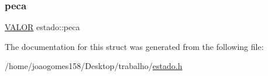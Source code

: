 \mbox{\label{structestado_aa67173516d3e69f71354fb8874af5d64}} 
\subsubsection{\texorpdfstring{peca}{peca}}
{\footnotesize\ttfamily \hyperlink{estado_8h_abfd806e47e2e69b38156c2eab6fda6c0}{V\+A\+L\+OR} estado\+::peca}



The documentation for this struct was generated from the following file\+:\begin{DoxyCompactItemize}
\item 
/home/joaogomes158/\+Desktop/trabalho/\hyperlink{estado_8h}{estado.\+h}\end{DoxyCompactItemize}
